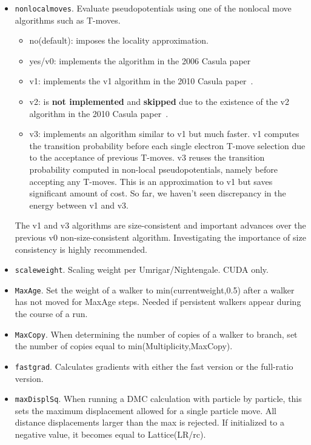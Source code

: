 \begin{itemize}
\item \texttt{nonlocalmoves}. Evaluate pseudopotentials using one of the nonlocal move algorithms such as T-moves.
\begin{itemize}
\item no(default): imposes the locality approximation.
\item yes/v0: implements the algorithm in the 2006 Casula paper~\cite{Casula2006}
\item v1: implements the v1 algorithm in the 2010 Casula paper~\cite{Casula2010}.
\item v2: is \textbf{not implemented} and \textbf{skipped} due to the existence of the v2 algorithm in the 2010 Casula paper~\cite{Casula2010}.
\item v3: implements an algorithm similar to v1 but much faster. v1 computes the transition probability before each single electron T-move selection due to the acceptance of previous T-moves. v3 reuses the transition probability computed in non-local pseudopotentials, namely before accepting any T-moves. This is an approximation to v1 but saves significant amount of cost. So far, we haven't seen discrepancy in the energy between v1 and v3.
\end{itemize}
The v1 and v3 algorithms are size-consistent and important advances over the previous v0 non-size-consistent algorithm. Investigating the importance of size consistency is highly recommended.

\item \texttt{scaleweight}. Scaling weight per Umrigar/Nightengale.  CUDA only.

\item \texttt{MaxAge}. Set the weight of a walker to min(currentweight,0.5) after a walker has not moved for MaxAge steps.  Needed if persistent walkers appear during the course of a run.

\item \texttt{MaxCopy}. When determining the number of copies of a walker to branch, set the number of copies equal to min(Multiplicity,MaxCopy).

\item \texttt{fastgrad}. Calculates gradients with either the fast version or the full-ratio version.

\item \texttt{maxDisplSq}.  When running a DMC calculation with particle by particle, this sets the maximum displacement allowed for a single particle move.  All distance displacements larger than the max is rejected.  If initialized to a negative value, it becomes equal to Lattice(LR/rc).


\end{itemize}
